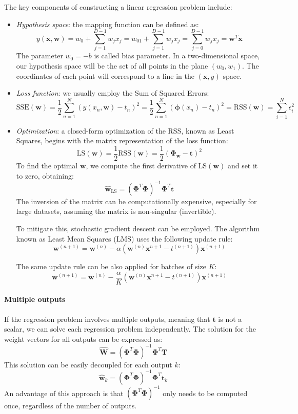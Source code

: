 The key components of constructing a linear regression problem include:
\begin{itemize}
    \item \textit{Hypothesis space}: the mapping function can be defined as: 
        \[y(\mathbf{x},\mathbf{w})=w_0+\sum_{j=1}^{D-1}w_j x_j=w_01+\sum_{j=1}^{D-1}w_j x_j=\sum_{j=0}^{D-1}w_j x_j=\mathbf{w}^T\mathbf{x}\]
        The parameter $w_0=-b$ is called bias parameter. 
        In a two-dimensional space, our hypothesis space will be the set of all points in the plane $(w_0,w_1)$. 
        The coordinates of each point will correspond to a line in the $\left( \mathbf{x}, y \right)$ space.
    \item \textit{Loss function}: we usually employ the Sum of Squared Errors: 
            \[\text{SSE}(\mathbf{w})=\dfrac{1}{2}\sum_{n=1}^{N}{\left( y(x_n, \mathbf{w})-t_n \right)}^2=\dfrac{1}{2}\sum_{n=1}^{N}{\left( \boldsymbol{\phi}(x_n)-t_n \right)}^2=\text{RSS}(\mathbf{w})=\sum_{i=1}^{N}\epsilon^2_i\]
    \item \textit{Optimization}: a closed-form optimization of the RSS, known as Least Squares, begins with the matrix representation of the loss function:
        \[\text{LS}(\mathbf{w})=\dfrac{1}{2}\text{RSS}(\mathbf{w})=\dfrac{1}{2}{\left( \boldsymbol{\Phi}_{\mathbf{w}}-\mathbf{t} \right)}^2\]
        To find the optimal $\mathbf{w}$, we compute the first derivative of $\text{LS}(\mathbf{w})$ and set it to zero, obtaining: 
        \[\hat{\mathbf{w}}_{\text{LS}}={( \boldsymbol{\Phi}^T\boldsymbol{\Phi})}^{-1}\boldsymbol{\Phi}^T\mathbf{t}\]
        The inversion of the matrix can be computationally expensive, especially for large datasets, assuming the matrix is non-singular (invertible). 
        
        To mitigate this, stochastic gradient descent can be employed.
        The algorithm known as Least Mean Squares (LMS) uses the following update rule:
        \[\mathbf{w}^{(n+1)}= \mathbf{w}^{(n)}-\alpha\left( \mathbf{w}^{(n)}\mathbf{x}^{n+1}-t^{(n+1)} \right)\mathbf{x}^{(n+1)}\]

        The same update rule can be also applied for batches of size $K$: 
        \[\mathbf{w}^{(n+1)}= \mathbf{w}^{(n)}-\dfrac{\alpha}{K}\left( \mathbf{w}^{(n)}\mathbf{x}^{n+1}-t^{(n+1)} \right)\mathbf{x}^{(n+1)}\]
\end{itemize}

\paragraph*{Multiple outputs}
If the regression problem involves multiple outputs, meaning that $\mathbf{t}$ is not a scalar, we can solve each regression problem independently.
The solution for the weight vectors for all outputs can be expressed as:
\[\hat{\mathbf{W}}={\left( \boldsymbol{\Phi}^T\boldsymbol{\Phi}\right)}^{-1}\boldsymbol{\Phi}^T\mathbf{T}\]
This solution can be easily decoupled for each output $k$: 
\[\hat{\mathbf{w}}_k={\left( \boldsymbol{\Phi}^T\boldsymbol{\Phi}\right)}^{-1}\boldsymbol{\Phi}^T\mathbf{t}_k\]
An advantage of this approach is that ${\left( \boldsymbol{\Phi}^T\boldsymbol{\Phi}\right)}^{-1}$ only needs to be computed once, regardless of the number of outputs.

